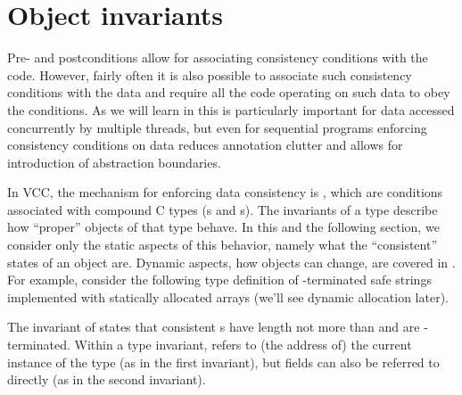 \section{Object invariants}
\label{sect:invariants}


Pre- and postconditions allow for associating consistency conditions
with the code.
However, fairly often it is also possible to associate such consistency
conditions with the data and require all the code operating on such data
to obey the conditions.
As we will learn in  this is particularly important for
data accessed concurrently by multiple threads,
but even for sequential programs enforcing consistency conditions
on data reduces annotation clutter and allows for introduction of abstraction
boundaries.


In VCC, the mechanism for enforcing data consistency is , which are conditions associated
with compound C types (s and s).
The invariants of a type describe how ``proper'' objects of that type
behave. 
In this and the following section, we consider only the static aspects of this
behavior, namely what the ``consistent'' states of an object are. 
Dynamic aspects, \ie how objects can change, are covered in .
For example, consider the following type definition of -terminated
safe strings implemented with statically allocated arrays (we'll see
dynamic allocation later).


\noindent
The invariant of  states that consistent
s have length not more than  and are
-terminated.  Within a type invariant, \vcc{\this} refers to
(the address of) the current instance of the type (as in the first
invariant), but fields can also be referred to directly (as in the
second invariant). 


